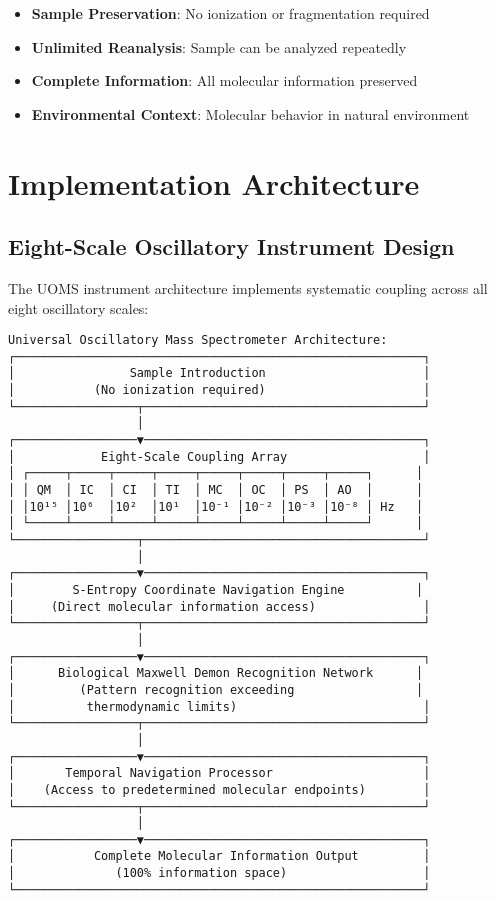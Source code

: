 \documentclass[12pt,a4paper]{article}
\begin{document}
\begin{itemize}
\item \textbf{Sample Preservation}: No ionization or fragmentation required
\item \textbf{Unlimited Reanalysis}: Sample can be analyzed repeatedly
\item \textbf{Complete Information}: All molecular information preserved
\item \textbf{Environmental Context}: Molecular behavior in natural environment
\end{itemize}

\section{Implementation Architecture}

\subsection{Eight-Scale Oscillatory Instrument Design}

The UOMS instrument architecture implements systematic coupling across all eight oscillatory scales:

\begin{verbatim}
Universal Oscillatory Mass Spectrometer Architecture:
┌─────────────────────────────────────────────────────────┐
│                Sample Introduction                      │
│           (No ionization required)                      │
└─────────────────┬───────────────────────────────────────┘
                  │
┌─────────────────▼───────────────────────────────────────┐
│            Eight-Scale Coupling Array                   │
│ ┌─────┬─────┬─────┬─────┬─────┬─────┬─────┬─────┐      │
│ │ QM  │ IC  │ CI  │ TI  │ MC  │ OC  │ PS  │ AO  │      │
│ │10¹⁵ │10⁶  │10²  │10¹  │10⁻¹ │10⁻² │10⁻³ │10⁻⁸ │ Hz   │
│ └─────┴─────┴─────┴─────┴─────┴─────┴─────┴─────┘      │
└─────────────────┬───────────────────────────────────────┘
                  │
┌─────────────────▼───────────────────────────────────────┐
│        S-Entropy Coordinate Navigation Engine          │
│     (Direct molecular information access)               │
└─────────────────┬───────────────────────────────────────┘
                  │
┌─────────────────▼───────────────────────────────────────┐
│      Biological Maxwell Demon Recognition Network      │
│         (Pattern recognition exceeding                 │
│          thermodynamic limits)                          │
└─────────────────┬───────────────────────────────────────┘
                  │
┌─────────────────▼───────────────────────────────────────┐
│       Temporal Navigation Processor                     │
│    (Access to predetermined molecular endpoints)        │
└─────────────────┬───────────────────────────────────────┘
                  │
┌─────────────────▼───────────────────────────────────────┐
│           Complete Molecular Information Output         │
│              (100% information space)                   │
└─────────────────────────────────────────────────────────┘
\end{verbatim}
\end{document}
